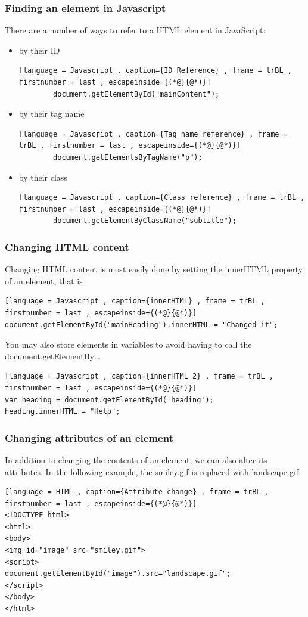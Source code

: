 \documentclass[a4paper]{article}
\theoremstyle{plain}
\theoremstyle{definition}
\theoremstyle{remark}
\begin{document}
\begin{flushleft}
\subsubsection{Finding an element in Javascript}
There are a number of ways to refer to a HTML element in JavaScript: 
\begin{itemize}
	\item by their ID
		\begin{lstlisting}[language = Javascript , caption={ID Reference} , frame = trBL , firstnumber = last , escapeinside={(*@}{@*)}]
		document.getElementById("mainContent");
		\end{lstlisting}
	\item by their tag name
		\begin{lstlisting}[language = Javascript , caption={Tag name reference} , frame = trBL , firstnumber = last , escapeinside={(*@}{@*)}]
		document.getElementsByTagName("p");	
		\end{lstlisting}
	\item by their class
		\begin{lstlisting}[language = Javascript , caption={Class reference} , frame = trBL , firstnumber = last , escapeinside={(*@}{@*)}]
		document.getElementByClassName("subtitle");
		\end{lstlisting}
\end{itemize}
\subsubsection{Changing HTML content}
Changing HTML content is most easily done by setting the innerHTML property of an element, that is
\begin{lstlisting}[language = Javascript , caption={innerHTML} , frame = trBL , firstnumber = last , escapeinside={(*@}{@*)}]
document.getElementById("mainHeading").innerHTML = "Changed it";
\end{lstlisting}
You may also store elements in variables to avoid having to call the document.getElementBy\ldots
\begin{lstlisting}[language = Javascript , caption={innerHTML 2} , frame = trBL , firstnumber = last , escapeinside={(*@}{@*)}]
var heading = document.getElementById('heading');
heading.innerHTML = "Help";
\end{lstlisting}
\subsubsection{Changing attributes of an element}
In addition to changing the contents of an element, we can also alter its attributes. In the following example, the smiley.gif is replaced with landscape.gif:
\begin{lstlisting}[language = HTML , caption={Attribute change} , frame = trBL , firstnumber = last , escapeinside={(*@}{@*)}]
<!DOCTYPE html>
<html>
<body>
<img id="image" src="smiley.gif">
<script>
document.getElementById("image").src="landscape.gif";
</script>
</body>
</html>
\end{lstlisting}

\end{flushleft}
\end{document}
